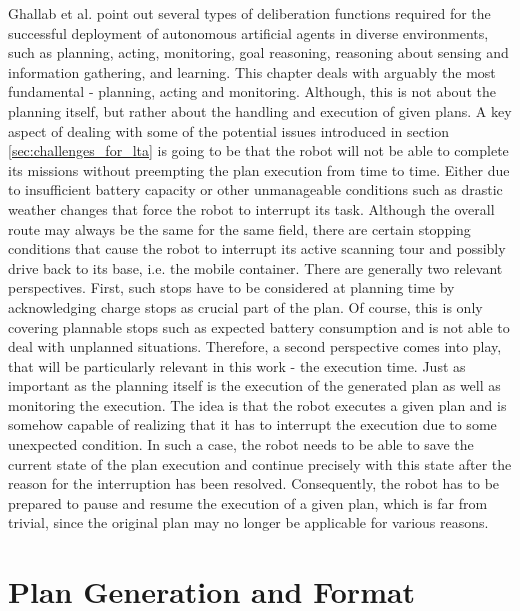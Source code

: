 \documentclass[english, master, utf8]{base/thesis_KBS}
\begin{document}
Ghallab et al. point out several types of deliberation functions required for the successful deployment of autonomous artificial agents in diverse environments,
such as planning, acting, monitoring, goal reasoning, reasoning about sensing and information gathering, and learning. \cite{GNT:2016} This chapter deals with arguably the most
fundamental - planning, acting and monitoring. Although, this is not about the planning itself, but rather about the handling and execution of given plans.
A key aspect of dealing with some of the potential issues introduced in section \ref{sec:challenges_for_lta} is going to be that the robot will not be able to
complete its missions without preempting the plan execution from time to time. Either due to insufficient battery capacity or other unmanageable conditions such as 
drastic weather changes that force the robot to interrupt its task. Although the overall route may always be the same for the same field, there are certain stopping
conditions that cause the robot to interrupt its active scanning tour and possibly drive back to its base, i.e. the mobile container.
There are generally two relevant perspectives. First, such stops have to be considered at planning time by acknowledging charge stops as crucial part of the plan.
Of course, this is only covering plannable stops such as expected battery consumption and is not able to deal with unplanned situations.
Therefore, a second perspective comes into play, that will be particularly relevant in this work - the execution time.
Just as important as the planning itself is the execution of the generated plan as well as monitoring the execution.
The idea is that the robot executes a given plan and is somehow capable of realizing that it has to interrupt the execution due to some unexpected condition.
In such a case, the robot needs to be able to save the current state of the plan execution and continue precisely with this state after the reason 
for the interruption has been resolved. Consequently, the robot has to be prepared to pause and resume the execution of a given plan, which is far from 
trivial, since the original plan may no longer be applicable for various reasons.

\section{Plan Generation and Format}
\label{sec:plan_generation}
\end{document}

